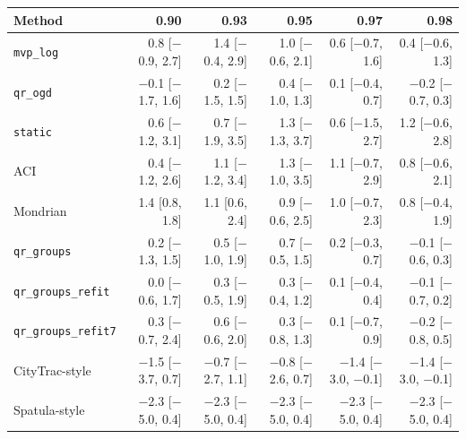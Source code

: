\setlength{\tabcolsep}{3.4pt}
\begin{tabular}{@{}lrrrrr@{}}
\toprule
Method & 0.90 & 0.93 & 0.95 & 0.97 & 0.98 \\
\midrule
\texttt{mvp\_log} & 0.8 [$-$0.9, 2.7] & 1.4 [$-$0.4, 2.9] & 1.0 [$-$0.6, 2.1] & 0.6 [$-$0.7, 1.6] & 0.4 [$-$0.6, 1.3] \\
\texttt{qr\_ogd} & $-$0.1 [$-$1.7, 1.6] & 0.2 [$-$1.5, 1.5] & 0.4 [$-$1.0, 1.3] & 0.1 [$-$0.4, 0.7] & $-$0.2 [$-$0.7, 0.3] \\
\texttt{static} & 0.6 [$-$1.2, 3.1] & 0.7 [$-$1.9, 3.5] & 1.3 [$-$1.3, 3.7] & 0.6 [$-$1.5, 2.7] & 1.2 [$-$0.6, 2.8] \\
ACI & 0.4 [$-$1.2, 2.6] & 1.1 [$-$1.2, 3.4] & 1.3 [$-$1.0, 3.5] & 1.1 [$-$0.7, 2.9] & 0.8 [$-$0.6, 2.1] \\
Mondrian & 1.4 [0.8, 1.8] & 1.1 [0.6, 2.4] & 0.9 [$-$0.6, 2.5] & 1.0 [$-$0.7, 2.3] & 0.8 [$-$0.4, 1.9] \\
\texttt{qr\_groups} & 0.2 [$-$1.3, 1.5] & 0.5 [$-$1.0, 1.9] & 0.7 [$-$0.5, 1.5] & 0.2 [$-$0.3, 0.7] & $-$0.1 [$-$0.6, 0.3] \\
\texttt{qr\_groups\_refit} & 0.0 [$-$0.6, 1.7] & 0.3 [$-$0.5, 1.9] & 0.3 [$-$0.4, 1.2] & 0.1 [$-$0.4, 0.4] & $-$0.1 [$-$0.7, 0.2] \\
\texttt{qr\_groups\_refit7} & 0.3 [$-$0.7, 2.4] & 0.6 [$-$0.6, 2.0] & 0.3 [$-$0.8, 1.3] & 0.1 [$-$0.7, 0.9] & $-$0.2 [$-$0.8, 0.5] \\
CityTrac-style & $-$1.5 [$-$3.7, 0.7] & $-$0.7 [$-$2.7, 1.1] & $-$0.8 [$-$2.6, 0.7] & $-$1.4 [$-$3.0, $-$0.1] & $-$1.4 [$-$3.0, $-$0.1] \\
Spatula-style & $-$2.3 [$-$5.0, 0.4] & $-$2.3 [$-$5.0, 0.4] & $-$2.3 [$-$5.0, 0.4] & $-$2.3 [$-$5.0, 0.4] & $-$2.3 [$-$5.0, 0.4] \\
\bottomrule
\end{tabular}
